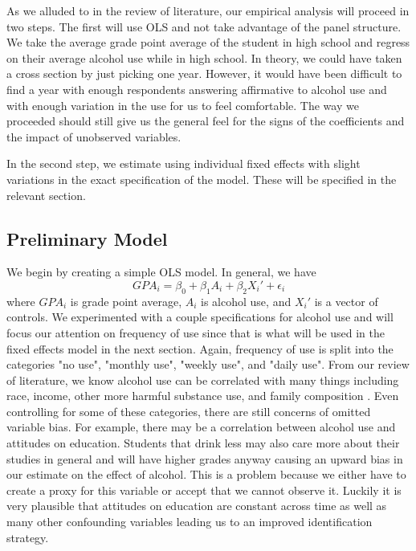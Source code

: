 \documentclass[11pt]{article}
\begin{document}
As we alluded to in the review of literature, our empirical analysis will proceed in two steps. The first will use OLS and not take advantage of the panel structure. We take the average grade point average of the student in high school and regress on their average alcohol use while in high school. In theory, we could have taken a cross section by just picking one year. However, it would have been difficult to find a year with enough respondents answering affirmative to alcohol use and with enough variation in the use for us to feel comfortable. The way we proceeded should still give us the general feel for the signs of the coefficients and the impact of unobserved variables. 

In the second step, we estimate using individual fixed effects with slight variations in the exact specification of the model. These will be specified in the relevant section.

\subsection*{Preliminary Model}
We begin by creating a simple OLS model. In general, we have
\begin{equation*}
    GPA_{i} = \beta_0 + \beta_1A_{i} + \beta_2X_{i}' + \epsilon_{i}
\end{equation*}
where $GPA_i$ is grade point average, $A_i$ is alcohol use, and $X_i'$ is a vector of controls. We experimented with a couple specifications for alcohol use and will focus our attention on frequency of use since that is what will be used in the fixed effects model in the next section. Again, frequency of use is split into the categories "no use", "monthly use", "weekly use", and "daily use". From our review of literature, we know alcohol use can be correlated with many things including race, income, other more harmful substance use, and family composition \cite{family}. Even controlling for some of these categories, there are still concerns of omitted variable bias. For example, there may be a correlation between alcohol use and attitudes on education. Students that drink less may also care more about their studies in general and will have higher grades anyway causing an upward bias in our estimate on the effect of alcohol. This is a problem because we either have to create a proxy for this variable or accept that we cannot observe it. Luckily it is very plausible that attitudes on education are constant across time as well as many other confounding variables leading us to an improved identification strategy.
\end{document}
